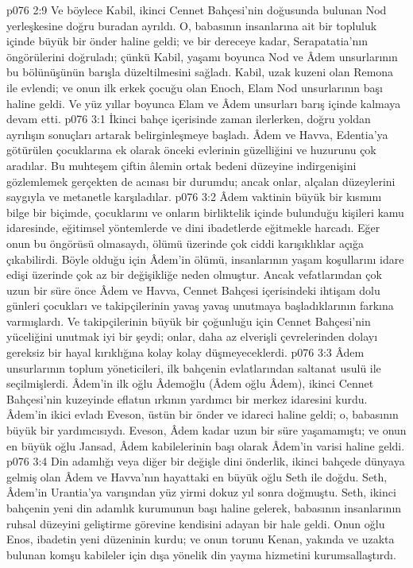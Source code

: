 \vs p076 2:9 Ve böylece Kabil, ikinci Cennet Bahçesi’nin doğusunda bulunan Nod yerleşkesine doğru buradan ayrıldı. O, babasının insanlarına ait bir topluluk içinde büyük bir önder haline geldi; ve bir dereceye kadar, Serapatatia’nın öngörülerini doğruladı; çünkü Kabil, yaşamı boyunca Nod ve Âdem unsurlarının bu bölünüşünün barışla düzeltilmesini sağladı. Kabil, uzak kuzeni olan Remona ile evlendi; ve onun ilk erkek çocuğu olan Enoch, Elam Nod unsurlarının başı haline geldi. Ve yüz yıllar boyunca Elam ve Âdem unsurları barış içinde kalmaya devam etti.
\vs p076 3:1 İkinci bahçe içerisinde zaman ilerlerken, doğru yoldan ayrılışın sonuçları artarak belirginleşmeye başladı. Âdem ve Havva, Edentia’ya götürülen çocuklarına ek olarak önceki evlerinin güzelliğini ve huzurunu çok aradılar. Bu muhteşem çiftin âlemin ortak bedeni düzeyine indirgenişini gözlemlemek gerçekten de acınası bir durumdu; ancak onlar, alçalan düzeylerini saygıyla ve metanetle karşıladılar.
\vs p076 3:2 Âdem vaktinin büyük bir kısmını bilge bir biçimde, çocuklarını ve onların birliktelik içinde bulunduğu kişileri kamu idaresinde, eğitimsel yöntemlerde ve dini ibadetlerde eğitmekle harcadı. Eğer onun bu öngörüsü olmasaydı, ölümü üzerinde çok ciddi karışıklıklar açığa çıkabilirdi. Böyle olduğu için Âdem’in ölümü, insanlarının yaşam koşullarını idare edişi üzerinde çok az bir değişikliğe neden olmuştur. Ancak vefatlarından çok uzun bir süre önce Âdem ve Havva, Cennet Bahçesi içerisindeki ihtişam dolu günleri çocukları ve takipçilerinin yavaş yavaş unutmaya başladıklarının farkına varmışlardı. Ve takipçilerinin büyük bir çoğunluğu için Cennet Bahçesi’nin yüceliğini unutmak iyi bir şeydi; onlar, daha az elverişli çevrelerinden dolayı gereksiz bir hayal kırıklığına kolay kolay düşmeyeceklerdi.
\vs p076 3:3 Âdem unsurlarının toplum yöneticileri, ilk bahçenin evlatlarından saltanat usulü ile seçilmişlerdi. Âdem’in ilk oğlu Âdemoğlu (Âdem oğlu Âdem), ikinci Cennet Bahçesi’nin kuzeyinde eflatun ırkının yardımcı bir merkez idaresini kurdu. Âdem’in ikici evladı Eveson, üstün bir önder ve idareci haline geldi; o, babasının büyük bir yardımcısıydı. Eveson, Âdem kadar uzun bir süre yaşamamıştı; ve onun en büyük oğlu Jansad, Âdem kabilelerinin başı olarak Âdem’in varisi haline geldi.
\vs p076 3:4 Din adamlığı veya diğer bir değişle dini önderlik, ikinci bahçede dünyaya gelmiş olan Âdem ve Havva’nın hayattaki en büyük oğlu Seth ile doğdu. Seth, Âdem’in Urantia’ya varışından yüz yirmi dokuz yıl sonra doğmuştu. Seth, ikinci bahçenin yeni din adamlık kurumunun başı haline gelerek, babasının insanlarının ruhsal düzeyini geliştirme görevine kendisini adayan bir hale geldi. Onun oğlu Enos, ibadetin yeni düzeninin kurdu; ve onun torunu Kenan, yakında ve uzakta bulunan komşu kabileler için dışa yönelik din yayma hizmetini kurumsallaştırdı.
